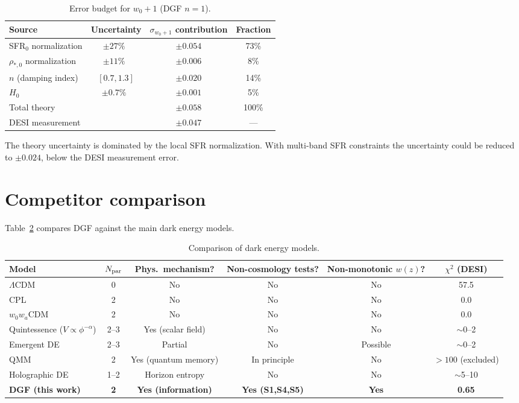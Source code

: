 \documentclass[12pt,a4paper]{article}
\begin{document}
\begin{table}[htbp]
\centering
\caption{Error budget for $w_0+1$ (DGF $n=1$).}
\label{sm:errors}
\begin{tabular}{lccc}
\toprule
Source & Uncertainty & $\sigma_{w_0+1}$ contribution & Fraction \\
\midrule
SFR$_0$ normalization & $\pm27\%$~\cite{madau2014,driver2018} & $\pm0.054$ & 73\% \\
$\rho_{*,0}$ normalization & $\pm11\%$~\cite{driver2018} & $\pm0.006$ & 8\% \\
$n$ (damping index) & $[0.7,1.3]$ & $\pm0.020$ & 14\% \\
$H_0$ & $\pm0.7\%$~\cite{planck2018} & $\pm0.001$ & 5\% \\
\midrule
Total theory & & $\pm0.058$ & 100\% \\
DESI measurement & & $\pm0.047$ & --- \\
\bottomrule
\end{tabular}
\end{table}

The theory uncertainty is dominated by the local SFR normalization. With multi-band SFR constraints the uncertainty could be reduced to $\pm0.024$, below the DESI measurement error.

\section{Competitor comparison}

Table~\ref{sm:competitors} compares DGF against the main dark energy models.

\begin{table}[htbp]
\centering
\caption{Comparison of dark energy models.}
\label{sm:competitors}
\begin{tabular}{lccccc}
\toprule
Model & $N_{\rm par}$ & Phys.\ mechanism? & Non-cosmology tests? & Non-monotonic $w(z)$? & $\chi^2$ (DESI) \\
\midrule
$\Lambda$CDM & 0 & No & No & No & 57.5 \\
CPL & 2 & No & No & No & 0.0 \\
$w_0w_a$CDM & 2 & No & No & No & 0.0 \\
Quintessence ($V\propto\phi^{-\alpha}$) & 2--3 & Yes (scalar field) & No & No & $\sim$0--2 \\
Emergent DE~\cite{li2024} & 2--3 & Partial & No & Possible & $\sim$0--2 \\
QMM~\cite{neukart2025} & 2 & Yes (quantum memory) & In principle & No & $>100$ (excluded) \\
Holographic DE & 1--2 & Horizon entropy & No & No & $\sim$5--10 \\
{\bf DGF (this work)} & {\bf 2} & {\bf Yes (information)} & {\bf Yes (S1,S4,S5)} & {\bf Yes} & {\bf 0.65} \\
\bottomrule
\end{tabular}
\end{table}
\end{document}
